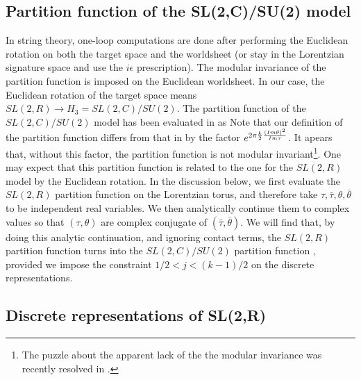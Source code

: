 \subsection{Partition function of the SL(2,C)/SU(2) model}


In string theory, one-loop 
computations are done after performing the
Euclidean rotation on both the target space
and the worldsheet (or stay in the Lorentzian 
signature space and use the $i\epsilon$ prescription). 
The modular invariance of the partition function
is imposed on the Euclidean worldsheet. 
In our case, the Euclidean rotation of the target space
means $SL(2,R) \rightarrow H_3=SL(2,C)/SU(2)$. 
The partition
function of the $SL(2,C)/SU(2)$ model
has been evaluated in \cite{Gawedzki:1991yu}
as
Note that our 
definition of the partition function differs
from that in \cite{Gawedzki:1991yu} by the
factor $e^{2\pi {k \over 2} {(Im \theta)^2 \over
Im \tau}}$. It apears that, without this factor,
the partition function is not modular invariant\footnote{The
puzzle about the apparent lack of the the modular invariance 
was recently resolved in \cite{mos}.}.
One may expect
that this partition function is related to the
one for the $SL(2,R)$ model by the Euclidean rotation. 
In the discussion below, we first evaluate
the $SL(2,R)$ partition function on the Lorentzian
torus, and therefore take $\tau, \bar \tau, \theta,
\bar \theta$ to be independent real variables.
We then analytically continue them to complex values so
that $(\tau,\theta)$ are complex conjugate of $(\bar\tau,
\bar\theta)$. 
We will find that, by doing this analytic continuation, 
and ignoring  contact terms,
the $SL(2,R)$ partition function turns into
the $SL(2,C)/SU(2)$ partition function \gawedzkipartition , 
provided we impose the constraint
$1/2 < j < (k-1)/2$ on the discrete representations. 


\subsection{Discrete representations of SL(2,R)}


